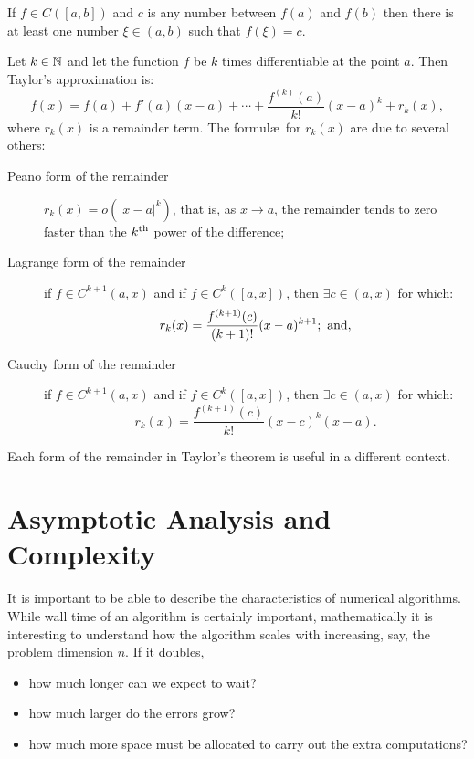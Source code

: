 \begin{theorem}
If $f\in C([a,b])$ and $c$ is any number between $f(a)$ and $f(b)$ then there is at least one number $\xi\in(a,b)$ such that $f(\xi) = c$.
\end{theorem}

\begin{theorem}\label{eq:Taylor}
Let $k\in\mathbb{N}$ and let the function $f$ be $k$ times differentiable at the point $a$. Then Taylor's approximation is:
\[
f(x) = f(a) + f'(a)(x-a) + \cdots + \dfrac{f^{(k)}(a)}{k!}(x-a)^k + r_k(x),
\]
where $r_k(x)$ is a remainder term. The formul\ae~for $r_k(x)$ are due to several others:
\begin{description}
\item[Peano form of the remainder] $r_k(x) = o(|x-a|^k)$, that is, as $x\to a$, the remainder tends to zero faster than the $k^{\rm th}$ power of the difference;
\item[Lagrange form of the remainder] if $f\in C^{k+1}(a,x)$ and if $f\in C^k([a,x])$, then $\exists c\in(a,x)$ for which:
\[
r_k(x) = \dfrac{f^{(k+1)}(c)}{(k+1)!}(x-a)^{k+1};\hbox{ and},
\]
\item[Cauchy form of the remainder] if $f\in C^{k+1}(a,x)$ and if $f\in C^k([a,x])$, then $\exists c\in(a,x)$ for which:
\[
r_k(x) = \dfrac{f^{(k+1)}(c)}{k!}(x-c)^{k}(x-a).
\]
\end{description}
\end{theorem}
Each form of the remainder in Taylor's theorem is useful in a different context.

\section{Asymptotic Analysis and Complexity}

It is important to be able to describe the characteristics of numerical algorithms. While wall time of an algorithm is certainly important, mathematically it is interesting to understand how the algorithm scales with increasing, say, the problem dimension $n$. If it doubles, 
\begin{itemize}
\item how much longer can we expect to wait?
\item how much larger do the errors grow?
\item how much more space must be allocated to carry out the extra computations?
\end{itemize}

